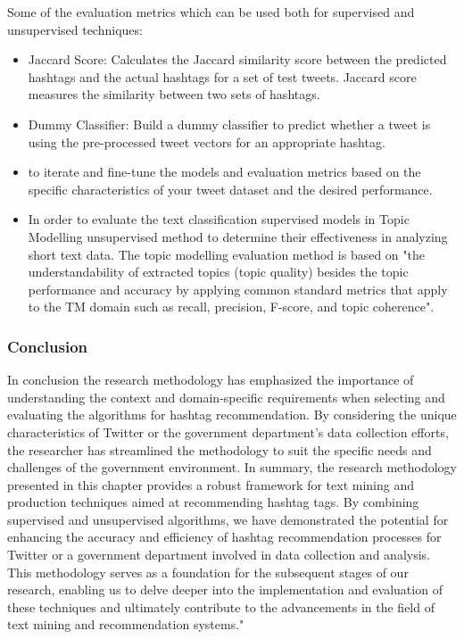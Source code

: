 Some of the evaluation metrics which can be used both for supervised and unsupervised techniques:

\begin{itemize}
    \item Jaccard Score: Calculates the Jaccard similarity score between the predicted hashtags and the actual hashtags for a set of test tweets. Jaccard score measures the similarity between two sets of hashtags.\\
\end{itemize}
\begin{itemize}
    \item Dummy Classifier: Build a dummy classifier to predict whether a tweet is  using the pre-processed tweet vectors for an appropriate hashtag.
\end{itemize}

\begin{itemize}
    \item to iterate and fine-tune the models and evaluation metrics based on the specific characteristics of your tweet dataset and the desired performance.
\end{itemize}
\begin{itemize}
    \item In order to evaluate the text classification supervised models in Topic Modelling unsupervised method to determine their effectiveness in analyzing short text data.   The topic modelling evaluation method is based on "the understandability of extracted topics (topic quality) besides the topic performance and accuracy by applying common standard metrics that apply to the TM domain such as recall, precision, F-score, and topic coherence".
\end{itemize}


\subsubsection{Conclusion}

In conclusion the research methodology has emphasized the importance of understanding the context and domain-specific requirements when selecting and evaluating the algorithms for hashtag recommendation. By considering the unique characteristics of Twitter or the government department's data collection efforts, the researcher has streamlined the methodology to suit the specific needs and challenges of the government environment.
In summary, the research methodology presented in this chapter provides a robust framework for text mining and production techniques aimed at recommending hashtag tags. By combining supervised and unsupervised algorithms, we have demonstrated the potential for enhancing the accuracy and efficiency of hashtag recommendation processes for Twitter or a government department involved in data collection and analysis. This methodology serves as a foundation for the subsequent stages of our research, enabling us to delve deeper into the implementation and evaluation of these techniques and ultimately contribute to the advancements in the field of text mining and recommendation systems."











